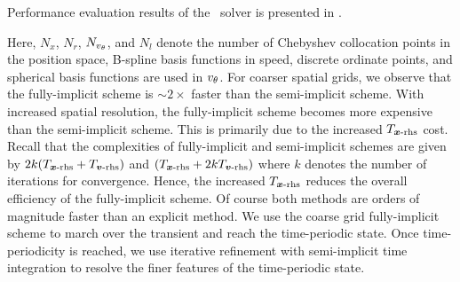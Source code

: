 Performance evaluation results of the \bte~solver is presented in . 
\begin{table}[!tbhp]
	\centering
	\caption{Comparison of the overall timestep cost for the \bte~solver using semi-implicit and fully-implicit schemes. Although the fully implicit solver is more expensive per timestep, it is faster overall because it requires fewer timesteps. The last column shows the overall runtime (semi-implicit / fully-implicit). The fully-implicit scheme is $\sim2\times$ faster than the semi-implicit scheme for coarser spatial grids $N_x$=100. For $N_x\geq 200$ the fully-implicit solve becomes too expensive.
		\label{tab:performance_hybrid}}
\end{table}
Here, $N_x$, $N_r$, $N_{v_{\theta}}$, and $N_l$ denote the number of Chebyshev collocation points in the position space, B-spline basis functions in speed, discrete ordinate points, and spherical basis functions are used in ${v_{\theta}}$. For coarser spatial grids, we observe that the fully-implicit scheme is $\sim 2\times$ faster than the semi-implicit scheme. With increased spatial resolution, the fully-implicit scheme becomes more expensive than the semi-implicit scheme. This is primarily due to the increased $T_{\boldsymbol{x}\text{-rhs}}$ cost. Recall that the  complexities of fully-implicit and semi-implicit schemes are given by $2k(T_{\boldsymbol{x}\text{-rhs}} + T_{\boldsymbol{v}\text{-rhs}})$ and $(T_{\boldsymbol{x}\text{-rhs}} + 2k T_{\boldsymbol{v}\text{-rhs}})$ where $k$ denotes the number of iterations for convergence. Hence, the increased $T_{\boldsymbol{x}\text{-rhs}}$ reduces the overall efficiency of the fully-implicit scheme. Of course both methods are orders of magnitude faster than an explicit method. We use the coarse grid fully-implicit scheme to march over the transient and reach the time-periodic state. Once time-periodicity is reached, we use iterative refinement with semi-implicit time integration to resolve the finer features of the time-periodic state.


